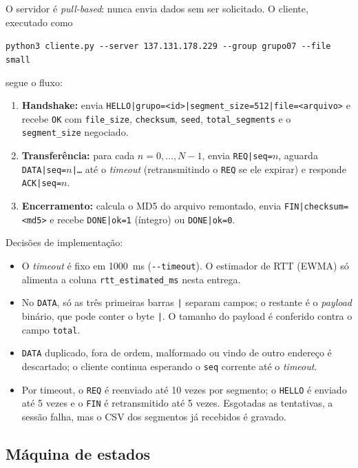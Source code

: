 \documentclass[11pt,a4paper]{article}
\begin{document}
O servidor é \textit{pull-based}: nunca envia dados sem ser solicitado. O cliente,
executado como
\begin{center}
\texttt{python3 cliente.py -{}-server 137.131.178.229 -{}-group grupo07 -{}-file small}
\end{center}
segue o fluxo:
\begin{enumerate}
  \item \textbf{Handshake:} envia \texttt{HELLO|grupo=<id>|}\allowbreak\texttt{segment\_size=512|file=<arquivo>}
        e recebe \texttt{OK} com \texttt{file\_size}, \texttt{checksum}, \texttt{seed},
        \texttt{total\_segments} e o \texttt{segment\_size} negociado.
  \item \textbf{Transferência:} para cada $n = 0,\dots,N-1$, envia \texttt{REQ|seq=$n$},
        aguarda \texttt{DATA|seq=$n$|\dots} até o \textit{timeout} (retransmitindo o
        \texttt{REQ} se ele expirar) e responde \texttt{ACK|seq=$n$}.
  \item \textbf{Encerramento:} calcula o MD5 do arquivo remontado, envia
        \texttt{FIN|checksum=<md5>} e recebe \texttt{DONE|ok=1} (íntegro) ou
        \texttt{DONE|ok=0}.
\end{enumerate}

Decisões de implementação:
\begin{itemize}
  \item O \textit{timeout} é fixo em 1000~ms (\texttt{-{}-timeout}). O estimador de RTT
        (EWMA) só alimenta a coluna \texttt{rtt\_estimated\_ms} nesta entrega.
  \item No \texttt{DATA}, só as três primeiras barras \texttt{|} separam campos; o restante
        é o \textit{payload} binário, que pode conter o byte \texttt{|}. O tamanho do
        payload é conferido contra o campo \texttt{total}.
  \item \texttt{DATA} duplicado, fora de ordem, malformado ou vindo de outro endereço é
        descartado; o cliente continua esperando o \texttt{seq} corrente até o
        \textit{timeout}.
  \item Por timeout, o \texttt{REQ} é reenviado até 10 vezes por segmento; o \texttt{HELLO}
        é enviado até 5 vezes e o \texttt{FIN} é retransmitido até 5 vezes. Esgotadas as tentativas, a
        sessão falha, mas o CSV dos segmentos já recebidos é gravado.
\end{itemize}

\subsection{Máquina de estados}
\end{document}
